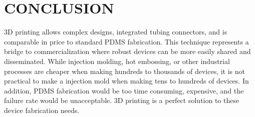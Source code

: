 \documentclass{article}
\begin{document}
\section{CONCLUSION}

3D printing allows complex designs, integrated tubing connectors, and is comparable in price to standard PDMS fabrication.
This technique represents a bridge to commercialization where robust devices can be more easily shared and disseminated.
While injection molding, hot embossing, or other industrial processes are cheaper when making hundreds to thousands of devices, it is not practical to make a injection mold when making tens to hundreds of devices.
In addition, PDMS fabrication would be too time consuming, expensive, and the failure rate would be unacceptable.
3D printing is a perfect solution to these device fabrication needs.



\end{document}
